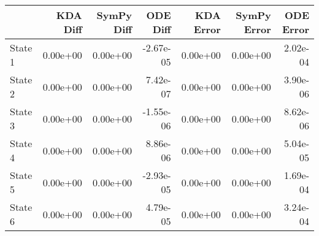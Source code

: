 \begin{tabular}{lrrrrrr}
\toprule
{} &  KDA Diff &  SymPy Diff &  ODE Diff &  KDA Error &  SymPy Error &  ODE Error \\
\midrule
State 1 &  0.00e+00 &    0.00e+00 & -2.67e-05 &   0.00e+00 &     0.00e+00 &   2.02e-04 \\
State 2 &  0.00e+00 &    0.00e+00 &  7.42e-07 &   0.00e+00 &     0.00e+00 &   3.90e-06 \\
State 3 &  0.00e+00 &    0.00e+00 & -1.55e-06 &   0.00e+00 &     0.00e+00 &   8.62e-06 \\
State 4 &  0.00e+00 &    0.00e+00 &  8.86e-06 &   0.00e+00 &     0.00e+00 &   5.04e-05 \\
State 5 &  0.00e+00 &    0.00e+00 & -2.93e-05 &   0.00e+00 &     0.00e+00 &   1.69e-04 \\
State 6 &  0.00e+00 &    0.00e+00 &  4.79e-05 &   0.00e+00 &     0.00e+00 &   3.24e-04 \\
\bottomrule
\end{tabular}
